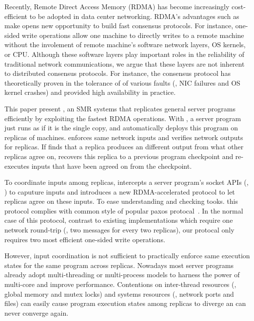 Recently, Remote Direct Access Memory (RDMA) has become increasingly 
cost-efficient to be adopted in data center networking. RDMA's advantages such 
as make opens new opportunity to build fast consensus protocols. For 
instance, one-sided write operations allow one machine to directly writes to 
a remote machine without the involement of remote machine's software network 
layers, OS kernels, or CPU. Although these software layers play important roles 
in the reliability of traditional network communications, we argue that these 
layers are not inherent to distributed consensus protocols. For 
instance, the \paxos consensus protocol has theoretically proven in the 
tolerance of of various faults (\eg, NIC failures and OS kernel crashes) and 
provided high availability in practice.

This paper present \xxx, an SMR systems that replicates general server programs 
efficiently by exploiting the fastest RDMA operations. With \xxx, 
a server program just runs as if it is the single copy, and \xxx automatically 
deploys this program on replicas of machines. \xxx enforces same network 
inputs and verifies network outputs for replicas. If \xxx finds that a replica 
produces an different output from what other replicas agree on, \xxx recovers 
this replica to a previous program checkpoint and re-executes inputs that have 
been agreed on from the checkpoint. 



To coordinate inputs among replicas, \xxx intercepts a server program's socket 
APIs (\eg, \recv) to caputure inputs and introduces a new RDMA-accelerated 
\paxos protocol to let replicas agree on these inputs. To ease understanding 
and checking tooks. this protocol complies with common style of popular paxos 
protocal~\cite{paxos:practical}. In the normal case of this protocol, contrast 
to existing implementations which require one network round-trip (\ie, two 
messages for every two replicas), our protocal only requires two most efficient 
one-sided write operations.


However, input coordination is not sufficient to practically enforce same 
execution states for the same program across replicas. Nowadays most server 
programs already adopt multi-threading or multi-process models to harness the 
power of multi-core and improve performance. Contentions on inter-thread 
resources (\eg, global memory and \pthread mutex locks) and systems resources 
(\eg, network ports and files) can easily cause program execution states among 
replicas to diverge an can never converge again. 

